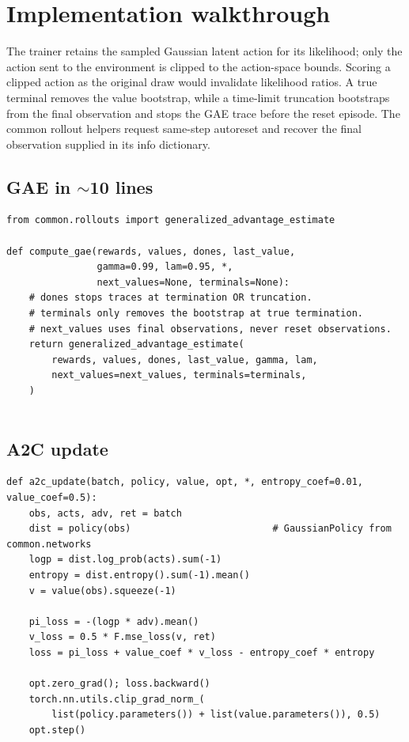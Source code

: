 \documentclass[11pt,oneside]{scrbook}
\begin{document}
\chapter{Implementation walkthrough}

The trainer retains the sampled Gaussian latent action for its likelihood;
only the action sent to the environment is clipped to the action-space bounds.
Scoring a clipped action as the original draw would invalidate likelihood ratios.
A true terminal removes the value bootstrap, while a time-limit truncation
bootstraps from the final observation and stops the GAE trace before the
reset episode. The common rollout helpers request same-step autoreset and
recover the final observation supplied in its info dictionary.


\section{GAE in $\sim$10 lines}

\begin{verbatim}
from common.rollouts import generalized_advantage_estimate

def compute_gae(rewards, values, dones, last_value,
                gamma=0.99, lam=0.95, *,
                next_values=None, terminals=None):
    # dones stops traces at termination OR truncation.
    # terminals only removes the bootstrap at true termination.
    # next_values uses final observations, never reset observations.
    return generalized_advantage_estimate(
        rewards, values, dones, last_value, gamma, lam,
        next_values=next_values, terminals=terminals,
    )


\end{verbatim}

\section{A2C update}

\begin{verbatim}
def a2c_update(batch, policy, value, opt, *, entropy_coef=0.01, value_coef=0.5):
    obs, acts, adv, ret = batch
    dist = policy(obs)                         # GaussianPolicy from common.networks
    logp = dist.log_prob(acts).sum(-1)
    entropy = dist.entropy().sum(-1).mean()
    v = value(obs).squeeze(-1)

    pi_loss = -(logp * adv).mean()
    v_loss = 0.5 * F.mse_loss(v, ret)
    loss = pi_loss + value_coef * v_loss - entropy_coef * entropy

    opt.zero_grad(); loss.backward()
    torch.nn.utils.clip_grad_norm_(
        list(policy.parameters()) + list(value.parameters()), 0.5)
    opt.step()
\end{verbatim}
\end{document}
